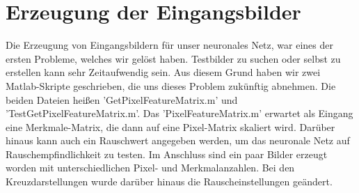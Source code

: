\section{Erzeugung der Eingangsbilder}

Die Erzeugung von Eingangsbildern für unser neuronales Netz, war eines der ersten Probleme, welches wir gelöst haben. Testbilder zu suchen oder selbst zu erstellen kann sehr Zeitaufwendig sein. Aus diesem Grund haben wir zwei Matlab-Skripte geschrieben, die uns dieses Problem zukünftig abnehmen. Die beiden Dateien heißen 'GetPixelFeatureMatrix.m' und 'TestGetPixelFeatureMatrix.m'. Das 'PixelFeatureMatrix.m' erwartet als Eingang eine Merkmale-Matrix, die dann auf eine Pixel-Matrix skaliert wird. Darüber hinaus kann auch ein Rauschwert angegeben werden, um das neuronale Netz auf Rauschempfindlichkeit zu testen. Im Anschluss sind ein paar Bilder erzeugt worden mit unterschiedlichen Pixel- und Merkmalanzahlen. Bei den Kreuzdarstellungen wurde darüber hinaus die Rauscheinstellungen geändert.

